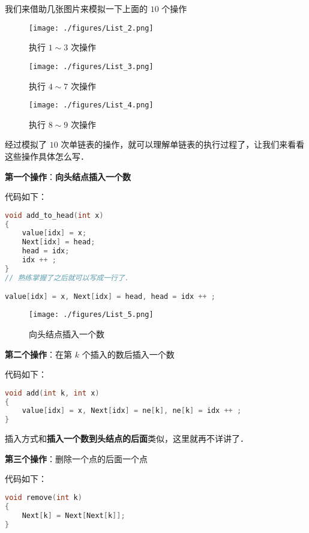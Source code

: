 我们来借助几张图片来模拟一下上面的 $10$ 个操作

\begin{figure}[ht]
\centering
\texttt{[image: ./figures/List\_2.png]}
\caption{执行 $1\sim3$ 次操作} \label{List_fig2}
\end{figure}

\begin{figure}[ht]
\centering
\texttt{[image: ./figures/List\_3.png]}
\caption{执行 $4\sim7$ 次操作} \label{List_fig3}
\end{figure}

\begin{figure}[ht]
\centering
\texttt{[image: ./figures/List\_4.png]}
\caption{执行 $8\sim9$ 次操作} \label{List_fig4}
\end{figure}

经过模拟了 $10$ 次单链表的操作，就可以理解单链表的执行过程了，让我们来看看这些操作具体怎么写．

\textbf{第一个操作}：\textbf{向头结点插入一个数}

代码如下：

\begin{lstlisting}[language=cpp]
void add_to_head(int x) 
{
    value[idx] = x;
    Next[idx] = head;
    head = idx;
    idx ++ ;
}
// 熟练掌握了之后就可以写成一行了．

value[idx] = x, Next[idx] = head, head = idx ++ ;
\end{lstlisting}

\begin{figure}[ht]
\centering
\texttt{[image: ./figures/List\_5.png]}
\caption{向头结点插入一个数} \label{List_fig5}
\end{figure}



\textbf{第二个操作}：在第 $k$ 个插入的数后插入一个数


代码如下：

\begin{lstlisting}[language=cpp]
void add(int k, int x)
{
    value[idx] = x, Next[idx] = ne[k], ne[k] = idx ++ ;
}
\end{lstlisting}

插入方式和\textbf{插入一个数到头结点的后面}类似，这里就再不详讲了．

\textbf{第三个操作}：删除一个点的后面一个点

代码如下：

\begin{lstlisting}[language=cpp]
void remove(int k)
{
    Next[k] = Next[Next[k]];
}
\end{lstlisting}


